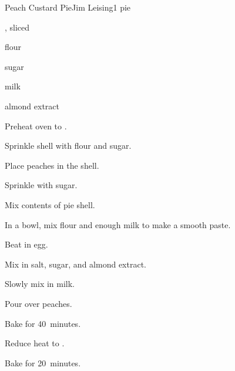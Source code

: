 \begin{recipe}{Peach Custard Pie}{Jim Leising}{1 pie}

\begin{ingredients}
\item {}, sliced
\item flour
\item sugar
\item milk
\item \tp{\half} almond extract
\end{ingredients}

\begin{directions}
\item Preheat oven to .
\item Sprinkle shell with flour and sugar.
\item Place peaches in the shell.
\item Sprinkle with \C{\threequarter} sugar.
\item Mix contents of pie shell.
\item In a bowl, mix  flour and enough milk to make a smooth paste.
\item Beat in egg.
\item Mix in salt,  sugar, and almond extract.
\item Slowly mix in \C{\half} milk.
\item Pour over peaches.
\item Bake for 40~minutes.
\item Reduce heat to .
\item Bake for 20~minutes.
\end{directions}

\end{recipe}
